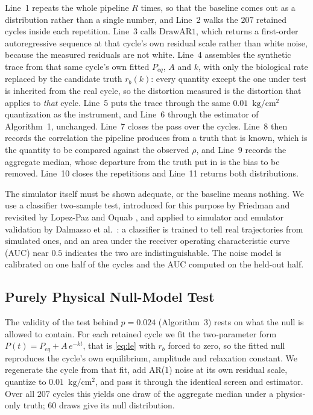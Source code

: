 \documentclass[sigconf]{acmart}
\newcommand{\pu}{\ensuremath{\mathrm{kg/cm^{2}}}}
\newcommand{\rb}{\ensuremath{r_{b}}}
\begin{document}
Line~1 repeats the whole
pipeline $R$ times, so that the baseline comes out as a distribution
rather than a single number, and Line~2 walks the $207$ retained
cycles inside each repetition. Line~3 calls $\mathrm{DrawAR1}$, which
returns a first-order autoregressive sequence at that cycle's own
residual scale rather than white noise, because the measured
residuals are not white. Line~4 assembles the synthetic
trace from that same cycle's own fitted $P_{eq}$, $A$ and $k$, with
only the biological rate replaced by the candidate truth $\rb(k)$:
every quantity except the one under test is inherited from the real
cycle, so the distortion measured is the distortion that applies to
\emph{that} cycle. Line~5 puts the trace through the same
$0.01$~\pu{} quantization as the instrument, and Line~6 through the
estimator of Algorithm~1, unchanged. Line~7 closes the pass over the
cycles. Line~8 then records the correlation the pipeline produces
from a truth that is known, which is the quantity to be compared
against the observed $\rho$, and Line~9 records the aggregate median,
whose departure from the truth put in is the bias to be removed.
Line~10 closes the repetitions and Line~11 returns both
distributions.

The simulator itself must be shown adequate, or the baseline means
nothing. We use a classifier two-sample test, introduced for this
purpose by Friedman \cite{friedman2003multivariate} and revisited by
Lopez-Paz and Oquab \cite{lopezpaz2017revisiting}, and applied to
simulator and emulator validation by Dalmasso et
al.~\cite{dalmasso2020validation}: a classifier is trained to tell real
trajectories from simulated ones, and an area under the receiver
operating characteristic curve (AUC) near $0.5$ indicates the
two are indistinguishable. The noise model is calibrated on one half of
the cycles and the AUC computed on the held-out half.

\subsection{Purely Physical Null-Model Test}
\label{sec:null}

The validity of the test behind $p=0.024$ (Algorithm~3) rests on what the null is
allowed to contain. For each retained cycle we fit the two-parameter
form $P(t)=P_{eq}+A\,e^{-kt}$, that is \eqref{eq:le} with $\rb$ forced
to zero, so the fitted null reproduces the cycle's own equilibrium,
amplitude and relaxation constant. We regenerate the cycle from that
fit, add AR(1) noise at its own residual scale, quantize to
$0.01$~\pu{}, and pass it through the identical screen and estimator.
Over all $207$ cycles this yields one draw of the aggregate median
under a physics-only truth; $60$ draws give its null distribution.
\end{document}
